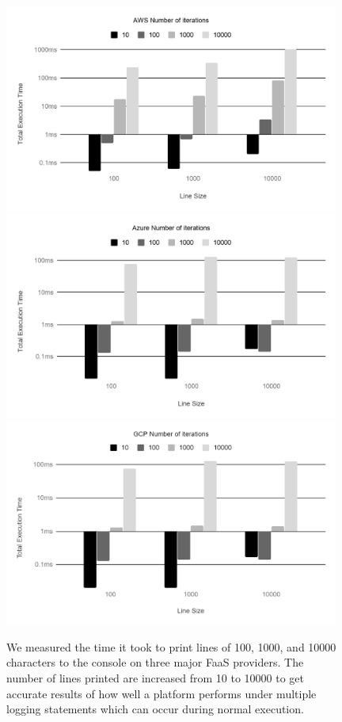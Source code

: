 \documentclass[../main.tex]{subfiles}
\begin{document}
\begin{figure}
\begin{center}
  \includegraphics[width=11cm, keepaspectratio]{./AWS-logging.png}\\
  \includegraphics[width=11cm, keepaspectratio]{./Azure-logging.png}\\
  \includegraphics[width=11cm, keepaspectratio]{./GCP-logging.png}
\end{center}
\caption[Results of Logging Tests on AWS, GCP and Azure]{%
  We measured the time it took to print lines of 100, 1000, and 10000 characters to the console on three major FaaS providers. 
  The number of lines printed are increased from 10 to 10000 to get accurate results of how well a platform performs 
  under multiple logging statements which can occur during normal execution.
}
\label{fig:providerLoggingTest}
\end{figure}
\end{document}
